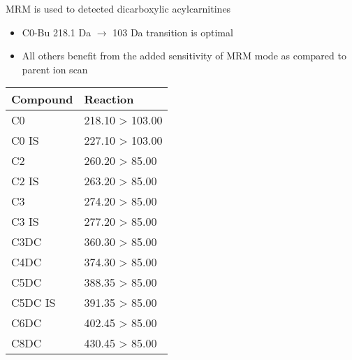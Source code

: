 \documentclass[presentation, smaller]{beamer}
\begin{document}
\begin{frame}[label={sec:orgheadline12}]{MRM is used to detected dicarboxylic acylcarnitines}
\begin{itemize}
\item C0-Bu 218.1 Da \(\to\) 103 Da transition is optimal
\item All others benefit from the added sensitivity of MRM mode as compared to parent ion scan
\end{itemize}

\small
\begin{center}
\begin{tabular}{ll}
Compound & Reaction\\
\hline
C0 & 218.10 > 103.00\\
C0 IS & 227.10 > 103.00\\
C2 & 260.20 > 85.00\\
C2 IS & 263.20 > 85.00\\
C3 & 274.20 > 85.00\\
C3 IS & 277.20 > 85.00\\
C3DC & 360.30 > 85.00\\
C4DC & 374.30 > 85.00\\
C5DC & 388.35 > 85.00\\
C5DC IS & 391.35 > 85.00\\
C6DC & 402.45 > 85.00\\
C8DC & 430.45 > 85.00\\
\end{tabular}
\end{center}
\end{frame}
\end{document}
